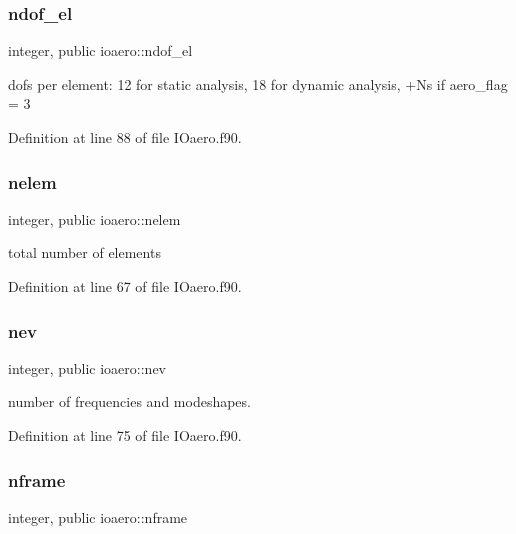 \subsubsection{\texorpdfstring{ndof\+\_\+el}{ndof\_el}}
{\footnotesize\ttfamily integer, public ioaero\+::ndof\+\_\+el}



dofs per element\+: 12 for static analysis, 18 for dynamic analysis, +\+Ns if aero\+\_\+flag = 3 



Definition at line 88 of file I\+Oaero.\+f90.

\mbox{\label{namespaceioaero_a543ebf3623a96606d0956211621ce254}} 
\subsubsection{\texorpdfstring{nelem}{nelem}}
{\footnotesize\ttfamily integer, public ioaero\+::nelem}



total number of elements 



Definition at line 67 of file I\+Oaero.\+f90.

\mbox{\label{namespaceioaero_a1216c8699aea9eb27e3d795cc9d8d271}} 
\subsubsection{\texorpdfstring{nev}{nev}}
{\footnotesize\ttfamily integer, public ioaero\+::nev}



number of frequencies and modeshapes. 



Definition at line 75 of file I\+Oaero.\+f90.

\mbox{\label{namespaceioaero_ac9fe2ddcc0797f81e7bc475a28692978}} 
\subsubsection{\texorpdfstring{nframe}{nframe}}
{\footnotesize\ttfamily integer, public ioaero\+::nframe}



